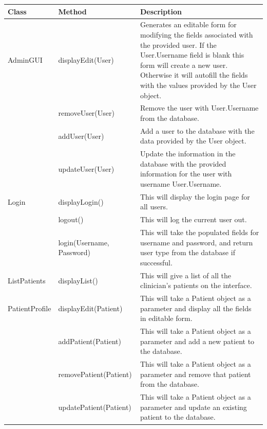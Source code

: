 \documentclass{article}
\begin{document}
\newpage
\begin{longtable}[t]{|p{1.5in}|p{2in}|p{2.5in}|}

\hline
\textbf{Class} & \textbf{Method} & \textbf{Description} \\

\hline
AdminGUI
			& displayEdit(User) & Generates an editable form for modifying the fields associated with the provided user. If the User.Username field is blank this form will create a new user. Otherwise it will autofill the fields with the values provided by the User object. \\
			
			\cline{2-3}
			& removeUser(User) & Remove the user with User.Username from the database. \\
			\cline{2-3}
			& addUser(User) & Add a user to the database with the data provided by the User object. \\
			\cline{2-3}
			& updateUser(User) & Update the information in the database with the provided information for the user with username User.Username. \\
			
\hline

Login
      & displayLogin() & This will display the login page for all users. \\
\cline{2-3}
      & logout() & This will log the current user out. \\
\cline{2-3}
      & login(Username, Password) & This will take the populated fields for username and password, and return user type from the database if successful. \\
\hline %

ListPatients
      & displayList() & This will give a list of all the clinician's patients on the interface. \\
\hline %

PatientProfile
      & displayEdit(Patient) & This will take a Patient object as a parameter and display all the fields in editable form. \\
\cline{2-3}
      & addPatient(Patient) & This will take a Patient object as a parameter and add a new patient to the database. \\
\cline{2-3}
      & removePatient(Patient) & This will take a Patient object as a parameter and remove that patient from the database. \\
\cline{2-3}
      & updatePatient(Patient) & This will take a Patient object as a parameter and update an existing patient to the database. \\



\end{longtable}
\end{document}
